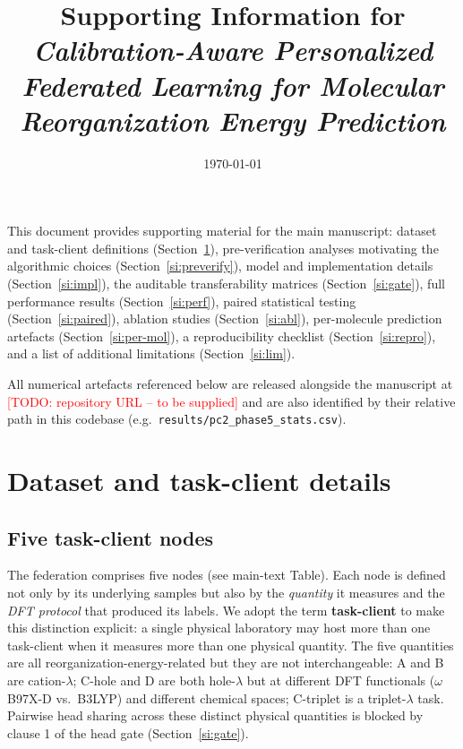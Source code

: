 \documentclass[11pt,a4paper]{article}
\title{Supporting Information for\\
\emph{Calibration-Aware Personalized Federated Learning for Molecular Reorganization Energy Prediction}}
\author{\TODO{Authors as in main.tex}}
\date{\today}
\newcommand{\TODO}[1]{\textcolor{red}{\textsf{[TODO: #1]}}}
\begin{document}
\maketitle

\noindent This document provides supporting material for the main manuscript: dataset and task-client definitions (Section~\ref{si:data}), pre-verification analyses motivating the algorithmic choices (Section~\ref{si:preverify}), model and implementation details (Section~\ref{si:impl}), the auditable transferability matrices (Section~\ref{si:gate}), full performance results (Section~\ref{si:perf}), paired statistical testing (Section~\ref{si:paired}), ablation studies (Section~\ref{si:abl}), per-molecule prediction artefacts (Section~\ref{si:per-mol}), a reproducibility checklist (Section~\ref{si:repro}), and a list of additional limitations (Section~\ref{si:lim}).

All numerical artefacts referenced below are released alongside the manuscript at \TODO{repository URL -- to be supplied} and are also identified by their relative path in this codebase (e.g.\ \texttt{results/pc2\_phase5\_stats.csv}).

\section{Dataset and task-client details}\label{si:data}

\subsection{Five task-client nodes}

The federation comprises five nodes (see main-text Table). Each node is defined not only by its underlying samples but also by the \emph{quantity} it measures and the \emph{DFT protocol} that produced its labels. We adopt the term \textbf{task-client} to make this distinction explicit: a single physical laboratory may host more than one task-client when it measures more than one physical quantity. The five quantities are all reorganization-energy-related but they are not interchangeable: A and B are cation-$\lambda$; C-hole and D are both hole-$\lambda$ but at different DFT functionals ($\omega$B97X-D vs.\ B3LYP) and different chemical spaces; C-triplet is a triplet-$\lambda$ task. Pairwise head sharing across these distinct physical quantities is blocked by clause 1 of the head gate (Section~\ref{si:gate}).
\end{document}
